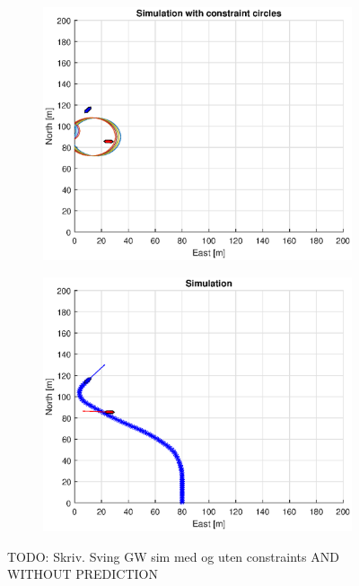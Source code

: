 \begin{figure}[ht]
\begin{subfigure}[b]{0.499\textwidth}
    \end{subfigure}
    \hfill
    \\
    \begin{subfigure}[b]{0.49\textwidth}
        \centering
        \includegraphics[width=\textwidth]{Images/Figures/sving_GW/Simple1_f1_Frame6}
    \end{subfigure}
    \hfill
    \begin{subfigure}[b]{0.499\textwidth}
        \centering
        \includegraphics[width=\textwidth]{Images/Figures/sving_GW/Simple1_f600_Frame6}
    \end{subfigure}
    \hfill
    \caption{TODO: Skriv. Sving GW sim med og uten constraints AND WITHOUT PREDICTION}
\end{figure}

